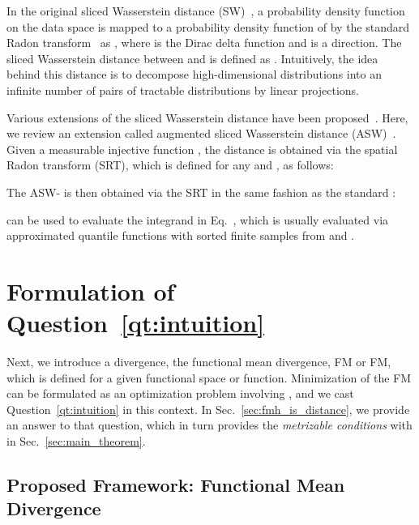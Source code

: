 In the original sliced Wasserstein distance (SW)~\citep{bonneel2015sliced}, a probability density function   on the data space  is mapped to a probability density function of  by the standard Radon transform~\citep{natterer2001mathematics,helgason2011radon} as , where  is the Dirac delta function and  is a direction. The sliced Wasserstein distance between  and  is defined as .
Intuitively, the idea behind this distance is to decompose high-dimensional distributions into an infinite number of pairs of tractable distributions by linear projections.


Various extensions of the sliced Wasserstein distance have been proposed~\citep{kolouri2019generalized,deshpande2019max,nguyen2021distributional}.
Here, we review an extension called augmented sliced Wasserstein distance (ASW)~\citep{chen2022augmented}. Given a measurable injective function , the distance is obtained via the spatial Radon transform (SRT), which is defined for any  and , as follows:

The ASW- is then obtained via the SRT in the same fashion as the standard :

 can be used to evaluate the integrand in Eq.~, which is usually evaluated via approximated quantile functions with sorted finite samples from  and .



\section{Formulation of Question~\ref{qt:intuition}}
\label{sec:def_fm}

Next, we introduce a divergence, the functional mean divergence, FM or FM, which is defined for a given functional space or function. Minimization of the FM can be formulated as an optimization problem involving , and we cast Question~\ref{qt:intuition} in this context.
In Sec.~\ref{sec:fmh_is_distance}, we provide an answer to that question, which in turn provides the \textit{metrizable conditions} with  in Sec.~\ref{sec:main_theorem}. 


\subsection{Proposed Framework: Functional Mean Divergence}
\label{ssec:fsw1_distance}

